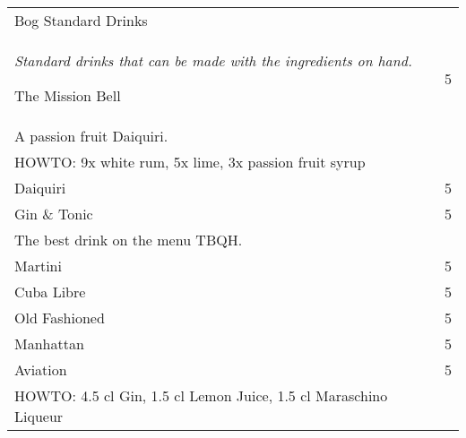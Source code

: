 \documentclass[12pt]{article}
\makeatletter
\newcommand*\ColText[1]{\textcolor{Goldenrod3}{#1}}
\newenvironment{Group}[1]
  {\noindent\begin{tabular*}{\textwidth}{@{}p{.8\linewidth}@{\extracolsep{\fill}}r@{}}
    {\fontsize{24}{29}\selectfont\ColText{#1}}\\[0.8em]}
  {\end{tabular*}}
\newcommand*\Entry[1]{%
  \sffamily#1 & 5 \\
}
\newcommand*\Expl[1]{
  \hspace*{1em}\footnotesize #1 \\
}
\newcommand*\HowTo[1]{
  HOWTO: \hspace*{1em}\footnotesize #1 \\
}
\makeatother
\begin{document}
\vfill

\begin{Group}{Bog Standard Drinks}
\emph{Standard drinks that can be made with the ingredients on hand.}

\Entry{The Mission Bell}
\Expl{A passion fruit Daiquiri.}
\HowTo{9x white rum, 5x lime, 3x passion fruit syrup}

\Entry{Daiquiri}
\Entry{Gin \& Tonic}
\Expl{The best drink on the menu TBQH.}
\Entry{Martini}
\Entry{Cuba Libre}
\Entry{Old Fashioned}
\Entry{Manhattan}

\Entry{Aviation}
\HowTo{4.5 cl Gin, 1.5 cl Lemon Juice, 1.5 cl Maraschino Liqueur}

\end{Group}
\end{document}
